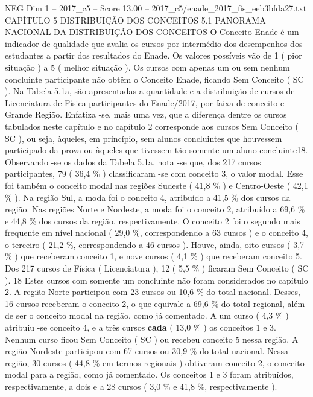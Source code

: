 \begin{textsample}{NEG Dim 1 – 2017\_c5 – Score 13.00 – 2017\_c5/enade\_2017\_fis\_eeb3bfda27.txt}  \label{ex:f1_neg_384}
CAPÍTULO 5 DISTRIBUIÇÃO DOS CONCEITOS 5.1 PANORAMA NACIONAL DA DISTRIBUIÇÃO DOS CONCEITOS O Conceito Enade é um indicador de qualidade que avalia os cursos por intermédio dos desempenhos dos estudantes a partir dos resultados do Enade.
Os valores possíveis vão de 1 ( pior situação ) a 5 ( melhor situação ).
Os cursos com apenas um ou sem nenhum concluinte participante não obtêm o Conceito Enade, ficando Sem Conceito ( SC ).
Na Tabela 5.1a, são apresentadas a quantidade e a distribuição de cursos de Licenciatura de Física participantes do Enade/2017, por faixa de conceito e Grande Região.
Enfatiza -se, mais uma vez, que a diferença dentre os cursos tabulados neste capítulo e no capítulo 2 corresponde aos cursos Sem Conceito ( SC ), ou seja, àqueles, em princípio, sem alunos concluintes que houvessem participado da prova ou àqueles que tivessem tão somente um aluno concluinte18.
Observando -se os dados da Tabela 5.1a, nota -se que, dos 217 cursos participantes, 79 ( 36,4 \% ) classificaram -se com conceito 3, o valor modal.
Esse foi também o conceito modal nas regiões Sudeste ( 41,8 \% ) e Centro-Oeste ( 42,1 \% ).
Na região Sul, a moda foi o conceito 4, atribuído a 41,5 \% dos cursos da região.
Nas regiões Norte e Nordeste, a moda foi o conceito 2, atribuído a 69,6 \% e 44,8 \% dos cursos da região, respectivamente.
O conceito 2 foi o segundo mais frequente em nível nacional ( 29,0 \%, correspondendo a 63 cursos ) e o conceito 4, o terceiro ( 21,2 \%, correspondendo a 46 cursos ).
Houve, ainda, oito cursos ( 3,7 \% ) que receberam conceito 1, e nove cursos ( 4,1 \% ) que receberam conceito 5.
Dos 217 cursos de Física ( Licenciatura ), 12 ( 5,5 \% ) ficaram Sem Conceito ( SC ). 18 Estes cursos com somente um concluinte não foram considerados no capítulo 2.
A região Norte participou com 23 cursos ou 10,6 \% do total nacional.
Desses, 16 cursos receberam o conceito 2, o que equivale a 69,6 \% do total regional, além de ser o conceito modal na região, como já comentado.
A um curso ( 4,3 \% ) atribuiu -se conceito 4, e a três cursos \textbf{cada} ( 13,0 \% ) os conceitos 1 e 3.
Nenhum curso ficou Sem Conceito ( SC ) ou recebeu conceito 5 nessa região.
A região Nordeste participou com 67 cursos ou 30,9 \% do total nacional.
Nessa região, 30 cursos ( 44,8 \% em termos regionais ) obtiveram conceito 2, o conceito modal para a região, como já comentado.
Os conceitos 1 e 3 foram atribuídos, respectivamente, a dois e a 28 cursos ( 3,0 \% e 41,8 \%, respectivamente ).

\end{textsample}
